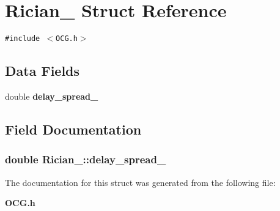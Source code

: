 \section{Rician\_\- Struct Reference}
\label{structRician__}
{\tt \#include $<$OCG.h$>$}

\subsection*{Data Fields}
\begin{CompactItemize}
\item 
double {\bf delay\_\-spread\_\-}
\end{CompactItemize}


\subsection{Field Documentation}
\subsubsection[{delay\_\-spread\_\-}]{\setlength{\rightskip}{0pt plus 5cm}double {\bf Rician\_\-::delay\_\-spread\_\-}}\label{structRician___4a613dfc218599b24fd37178b02bac9c}




The documentation for this struct was generated from the following file:\begin{CompactItemize}
\item 
{\bf OCG.h}\end{CompactItemize}
